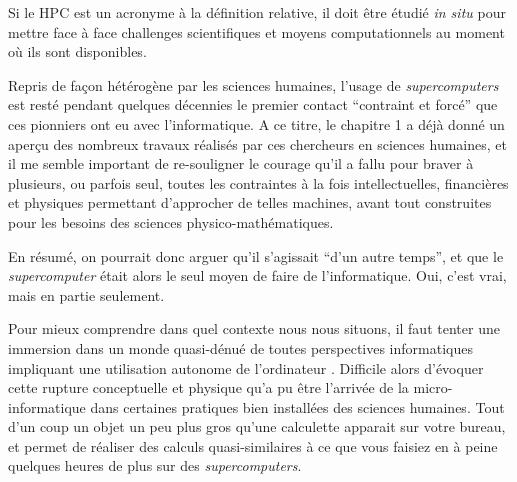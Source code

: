 



Si le HPC est un acronyme à la définition relative, il doit être étudié \textit{in situ} pour mettre face à face challenges scientifiques et moyens computationnels  au moment où ils sont disponibles.



Repris de façon hétérogène par les sciences humaines, l’usage de \textit{supercomputers} est resté pendant quelques décennies le premier contact \enquote{contraint et forcé} que ces pionniers ont eu avec l'informatique. A ce titre, le chapitre 1 a déjà donné un aperçu des nombreux travaux réalisés par ces chercheurs en sciences humaines, et il me semble important de re-souligner le courage qu'il a fallu pour braver à plusieurs, ou parfois seul, toutes les contraintes à la fois intellectuelles, financières et physiques permettant d'approcher de telles machines, avant tout construites pour les besoins des sciences physico-mathématiques.

En résumé, on pourrait donc arguer qu'il s'agissait \enquote{d'un autre temps}, et que le \textit{supercomputer} était alors le seul moyen de faire de l'informatique. Oui, c'est vrai, mais en partie seulement.

Pour mieux comprendre dans quel contexte nous nous situons, il faut tenter une immersion dans un monde quasi-dénué de toutes perspectives informatiques impliquant une utilisation autonome de l'ordinateur . Difficile alors d'évoquer cette rupture conceptuelle et physique qu'a pu être l'arrivée de la micro-informatique dans certaines pratiques bien installées des sciences humaines. Tout d'un coup un objet un peu plus gros qu'une calculette apparait sur votre bureau, et permet de réaliser des calculs quasi-similaires à ce que vous faisiez en à peine quelques heures de plus sur des \textit{supercomputers}.

